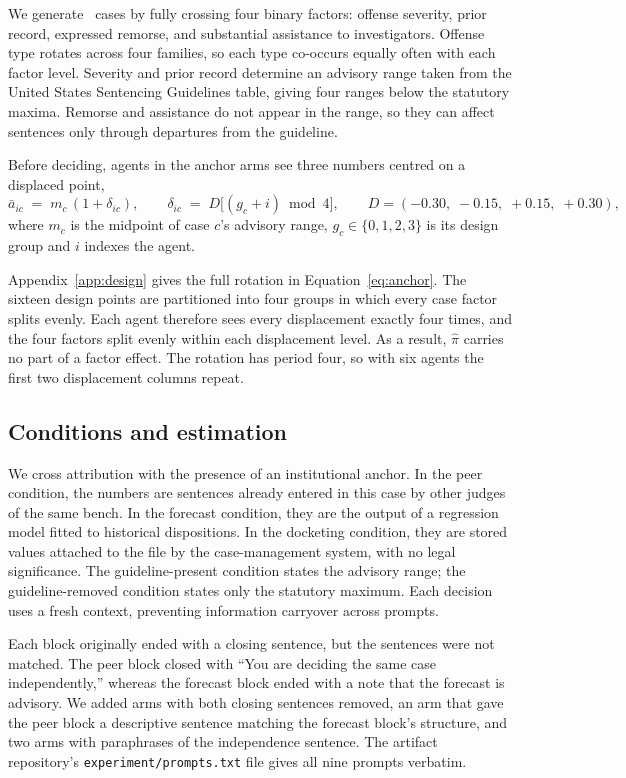 \documentclass{article}
\begin{document}
We generate \Ncases\ cases by fully crossing four binary factors: offense severity, prior record,
expressed remorse, and substantial assistance to investigators. Offense type rotates across four
families, so each type co-occurs equally often with each factor level. Severity and prior record
determine an advisory range taken from the United States Sentencing Guidelines table, giving four
ranges below the statutory maxima. Remorse and assistance do not appear in the range, so they can
affect sentences only through departures from the guideline.

Before deciding, agents in the anchor arms see three numbers centred on a displaced point,
\begin{equation}
\bar a_{ic} \;=\; m_c\,(1 + \delta_{ic}),
\qquad
\delta_{ic} \;=\; D\bigl[(g_c + i) \bmod 4\bigr],
\qquad
D = (-0.30,\; -0.15,\; +0.15,\; +0.30),
\label{eq:anchor}
\end{equation}
where $m_c$ is the midpoint of case $c$'s advisory range, $g_c \in \{0,1,2,3\}$ is its design group
and $i$ indexes the agent.

Appendix~\ref{app:design} gives the full rotation in Equation~\ref{eq:anchor}. The sixteen design
points are partitioned into four groups in which every case
factor splits evenly. Each agent therefore sees every displacement exactly four times, and the four
factors split evenly within each displacement level. As a result, $\hat\pi$ carries no part of a
factor effect. The rotation has period four, so with six agents the first two displacement columns
repeat.

\subsection{Conditions and estimation}

We cross attribution with the presence of an institutional anchor. In the peer condition, the
numbers are sentences already entered in this case by other judges of the same bench. In the
forecast condition, they are the output of a regression model fitted to historical dispositions. In
the docketing condition, they are stored values attached to the file by the case-management system,
with no legal significance. The guideline-present condition states the advisory range; the
guideline-removed condition states only the statutory maximum. Each decision uses a fresh context,
preventing information carryover across prompts.

Each block originally ended with a closing sentence, but the sentences were not matched. The peer
block closed with ``You are deciding the same case independently,'' whereas the forecast block ended
with a note that the forecast is advisory. We added arms with both closing sentences removed, an arm
that gave the peer block a descriptive sentence matching the forecast block's structure, and two arms
with paraphrases of the independence sentence. The artifact repository's \texttt{experiment/prompts.txt} file
gives all nine prompts verbatim.
\end{document}
